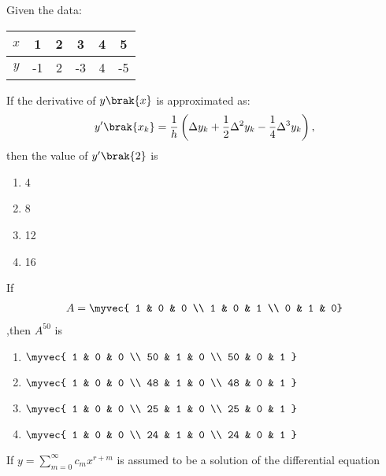 \item Given the data:

	\begin{table}[h!] \centering \begin{tabular}[12pt]{|c|c|c|c|c|c|}
    \hline
    $x$ & 1 & 2 & 3 & 4 & 5 \\
    \hline
    $y$ & -1 & 2 & -3 & 4 & -5 \\
    \hline
\end{tabular}

	\end{table}

If the derivative of $y \brak{x}$ is approximated as: \begin{align*} y^\prime \brak{x_k} = \frac{1}{h} \left( \Delta y_k + \frac{1}{2} \Delta^2 y_k - \frac{1}{4} \Delta^3 y_k 
\right), \end{align*} then the value of $y^\prime \brak{2}$ is

\begin{enumerate} \item 4 \item 8 \item 12 \item 16
\end{enumerate}

\item If \begin{align*}
	A = \myvec{ 1 & 0 & 0 \\ 1 & 0 & 1 \\ 0 & 1 & 0}
\end{align*} ,then $A^{50}$ is

\begin{enumerate} \item $\myvec{ 1 & 0 & 0 \\ 50 & 1 & 0 \\ 50 & 0 & 1 }$ \item $\myvec{ 1 & 0 & 0 \\ 48 & 1 & 0 \\ 48 & 0 & 1 }$ \item $\myvec{ 1 & 0 & 0 \\ 25 & 1 & 0 \\ 25 & 
0 & 1 }$ \item $\myvec{ 1 & 0 & 0 \\ 24 & 1 & 0 \\ 24 & 0 & 1 }$ \end{enumerate} \item If $y = \sum_{m=0}^{\infty} c_m x^{r+m}$ is assumed to be a solution of the differential 
equation

